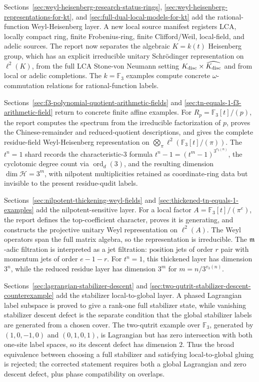 Sections~\ref{sec:weyl-heisenberg-research-status-rings},
\ref{sec:weyl-heisenberg-representations-for-kt}, and
\ref{sec:full-dual-local-models-for-kt} add the rational-function
Weyl-Heisenberg layer.  A new local source manifest registers LCA,
locally compact ring, finite Frobenius-ring, finite Clifford/Weil, local-field,
and adelic sources.  The report now separates the algebraic
\(K=k(t)\) Heisenberg group, which has an explicit irreducible unitary
Schrödinger representation on \(\ell^2(K)\), from the full LCA Stone-von
Neumann setting \(K_{\rm disc}\times\widehat{K_{\rm disc}}\) and from local or
adelic completions.  The \(k=\mathbb F_3\) examples compute concrete
\(\omega\)-commutation relations for rational-function labels.

Sections~\ref{sec:f3-polynomial-quotient-arithmetic-fields} and
\ref{sec:tn-equals-1-f3-arithmetic-field} return to concrete finite affine
examples.  For \(R_p=\mathbb F_3[t]/(p)\), the report computes the spectrum
from the irreducible factorization of \(p\), proves the Chinese-remainder and
reduced-quotient descriptions, and gives the complete residue-field
Weyl-Heisenberg representation on
\(\bigotimes_\pi\ell^2(\mathbb F_3[t]/(\pi))\).  The \(t^n=1\) shard records
the characteristic-\(3\) formula \(t^n-1=(t^m-1)^{3^{v_3(n)}}\), the
cyclotomic degree count via \(\operatorname{ord}_d(3)\), and the resulting
dimension \(\dim\mathcal H=3^m\), with nilpotent multiplicities retained as
coordinate-ring data but invisible to the present residue-qudit labels.

Sections~\ref{sec:nilpotent-thickening-weyl-fields} and
\ref{sec:thickened-tn-equals-1-examples} add the nilpotent-sensitive layer.
For a local factor \(A=\mathbb F_3[t]/(\pi^e)\), the report defines the
top-coefficient character, proves it is generating, and constructs the
projective unitary Weyl representation on \(\ell^2(A)\).  The Weyl operators
span the full matrix algebra, so the representation is irreducible.  The
\(\mathfrak m\)-adic filtration is interpreted as a jet filtration: position
jets of order \(r\) pair with momentum jets of order \(e-1-r\).  For
\(t^n=1\), this thickened layer has dimension \(3^n\), while the reduced
residue layer has dimension \(3^m\) for \(m=n/3^{v_3(n)}\).

Sections~\ref{sec:lagrangian-stabilizer-descent} and
\ref{sec:two-qutrit-stabilizer-descent-counterexample} add the stabilizer
local-to-global layer.  A phased Lagrangian label subspace is proved to give a
rank-one full stabilizer state, while vanishing stabilizer descent defect is
the separate condition that the global stabilizer labels are generated from a
chosen cover.  The two-qutrit example over \(\mathbb F_3\), generated by
\((1,0,-1,0)\) and \((0,1,0,1)\), is Lagrangian but has zero intersection
with both one-site label spaces, so its descent defect has dimension \(2\).
Thus the broad equivalence between choosing a full stabilizer and satisfying
local-to-global gluing is rejected; the corrected statement requires both a
global Lagrangian and zero descent defect, plus phase compatibility on
overlaps.

